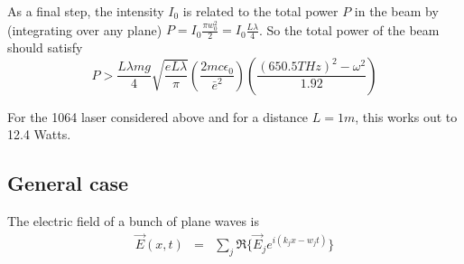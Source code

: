 \documentclass[aps,twocolumn,prb,floatfix,amsmath,amssymb,groupedaddress]{revtex4}
\begin{document}
As a final step, the intensity $I_0$ is related to the total power $P$ in the beam by (integrating over any plane) $P = I_0 \frac{\pi w_0^2}{2} = I_0 \frac{L\lambda}{4}$.  So the total power of the beam should satisfy
\[ P > \frac{L\lambda mg}{4} \sqrt{\frac{eL\lambda}{\pi}} \left(\frac{2mc\epsilon_0}{\bar{e}^2}\right) \left(\frac{(650.5 THz)^2 - \omega^2}{1.92}\right) \]

For the 1064 laser considered above and for a distance $L=1m$, this works out to 12.4 Watts.  

\subsection{General case}
The electric field of a bunch of plane waves is
\begin{eqnarray*}
\vec{E}(x,t) & = & \sum_j \Re\{\vec{E}_j e^{i(k_j x - w_j t)}\}
\end{eqnarray*}
\end{document}
